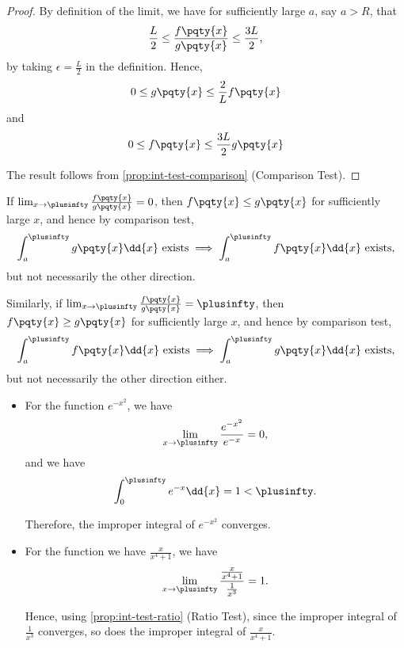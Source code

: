 \begin{proof}
    By definition of the limit, we have for sufficiently large \(a\), say \(a > R\), that
    \[
        \frac{L}{2} \leq \frac{f\pqty{x}}{g\pqty{x}} \leq \frac{3L}{2},
    \]
    by taking \(\epsilon = \frac{L}{2}\) in the definition. Hence,
    \[
        0 \leq g\pqty{x} \leq \frac{2}{L} f\pqty{x}
    \]
    and
    \[
        0 \leq f\pqty{x} \leq \frac{3L}{2} g\pqty{x}
    \]

    The result follows from \autoref{prop:int-test-comparison} (Comparison Test).
\end{proof}

\begin{remark}
    If \(\lim_{x \to \plusinfty} \frac{f\pqty{x}}{g\pqty{x}} = 0\), then \(f\pqty{x} \leq g\pqty{x}\) for sufficiently large \(x\), and hence by comparison test,
    \[
        \int_{a}^{\plusinfty} g\pqty{x} \dd{x} \text{ exists} \implies \int_{a}^{\plusinfty} f\pqty{x} \dd{x} \text{ exists},
    \]
    but not necessarily the other direction.

    Similarly, if \(\lim_{x \to \plusinfty} \frac{f\pqty{x}}{g\pqty{x}} = \plusinfty\), then \(f\pqty{x} \geq g\pqty{x}\) for sufficiently large \(x\), and hence by comparison test,
    \[
        \int_{a}^{\plusinfty} f\pqty{x} \dd{x} \text{ exists} \implies \int_{a}^{\plusinfty} g\pqty{x} \dd{x} \text{ exists},
    \]
    but not necessarily the other direction either.
\end{remark}

\begin{examples}
    \label{ex:application-ratio-test}%
    \begin{itemize}
        \item For the function \(e^{-x^2}\), we have
        \[
            \lim_{x \to \plusinfty} \frac{e^{-x^2}}{e^{-x}} = 0,
        \]
        and we have
        \[
            \int_{0}^{\plusinfty} e^{-x} \dd{x} = 1 < \plusinfty.
        \]

        Therefore, the improper integral of \(e^{-x^2}\) converges.

        \item For the function we have \(\frac{x}{x^4 + 1}\), we have
        \[
            \lim_{x \to \plusinfty} \frac{\frac{x}{x^4 + 1}}{\frac{1}{x^3}} = 1.
        \]

        Hence, using \autoref{prop:int-test-ratio} (Ratio Test), since the improper integral of \(\frac{1}{x^3}\) converges, so does the improper integral of \(\frac{x}{x^4 + 1}\).
    \end{itemize}
\end{examples}

